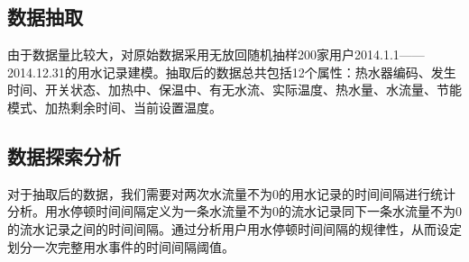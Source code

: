 \documentclass[11pt]{article}
\begin{document}
\subsection{数据抽取}\label{ux6570ux636eux62bdux53d6}

由于数据量比较大，对原始数据采用无放回随机抽样200家用户2014.1.1------2014.12.31的用水记录建模。抽取后的数据总共包括12个属性：热水器编码、发生时间、开关状态、加热中、保温中、有无水流、实际温度、热水量、水流量、节能模式、加热剩余时间、当前设置温度。

\subsection{数据探索分析}\label{ux6570ux636eux63a2ux7d22ux5206ux6790}

对于抽取后的数据，我们需要对两次水流量不为0的用水记录的时间间隔进行统计分析。用水停顿时间间隔定义为一条水流量不为0的流水记录同下一条水流量不为0的流水记录之间的时间间隔。通过分析用户用水停顿时间间隔的规律性，从而设定划分一次完整用水事件的时间间隔阈值。
\end{document}
